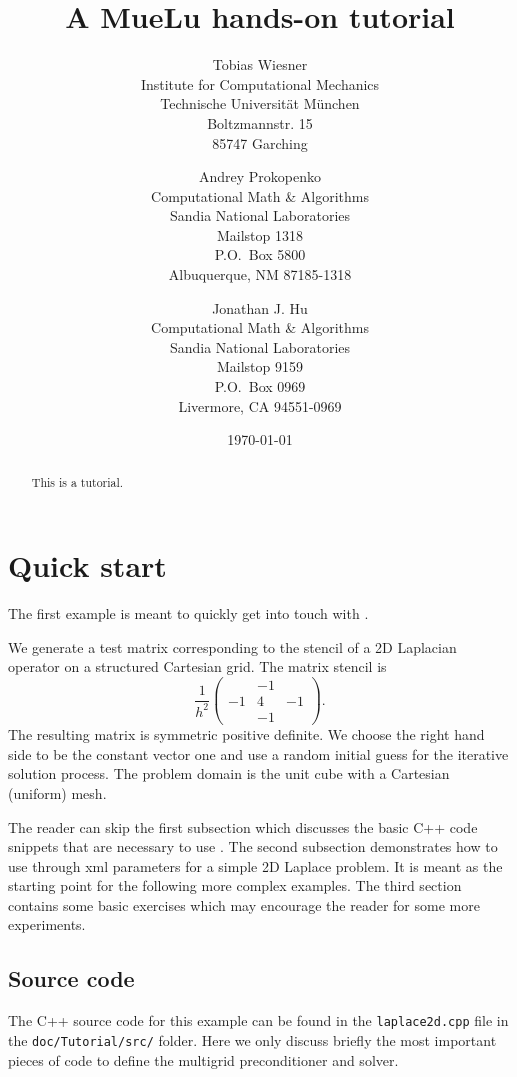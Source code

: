 \documentclass{article}
\title{A MueLu hands-on tutorial}
\author{Tobias Wiesner  \\
	Institute for Computational Mechanics \\
	Technische Universit\"at M\"unchen  \\
	Boltzmannstr. 15 \\
	85747 Garching
	\and 
Andrey Prokopenko \\
Computational Math \& Algorithms \\
Sandia National Laboratories\\
Mailstop 1318 \\
P.O.~Box 5800 \\
Albuquerque, NM 87185-1318\\
\and
Jonathan J. Hu \\
Computational Math \& Algorithms \\
Sandia National Laboratories\\
Mailstop 9159 \\
P.O.~Box 0969 \\
Livermore, CA 94551-0969
	}
\date{\today}
\begin{document}


\lstset{
  breaklines=true,                %
}

\maketitle


\begin{abstract}
This is a \muelu tutorial.
\end{abstract}

\section{Quick start}

The first example is meant to quickly get into touch with \muelu. 

We generate a test matrix corresponding to the stencil of a 2D Laplacian operator on a structured Cartesian grid. The matrix stencil is
\begin{displaymath}
\frac{1}{h^2}\begin{pmatrix} & -1 & \\ -1 & 4 & -1 \\ & -1 & \end{pmatrix}.
\end{displaymath}
The resulting matrix is symmetric positive definite. We choose the right hand side to be the constant vector one and use a random initial guess 
for the iterative solution process. The problem domain is the unit cube with a Cartesian (uniform) mesh.

The reader can skip the first subsection which discusses the basic C++ code snippets that are necessary to use \muelu.
The second subsection demonstrates how to use \muelu through xml parameters for a simple 2D Laplace problem. It is meant as the starting point for the following more complex examples.
The third section contains some basic exercises which may encourage the reader for some more experiments.

\subsection{Source code}

The C++ source code for this example can be found in the \texttt{laplace2d.cpp} file in the \texttt{doc/Tutorial/src/} folder. Here we only discuss briefly the most important pieces of code 
to define the multigrid preconditioner and solver.
\end{document}
